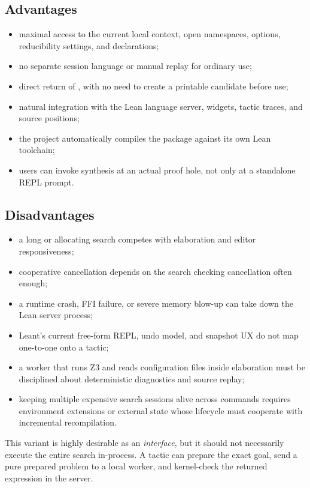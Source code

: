 \documentclass[10pt,letterpaper,oneside]{report}
\newcommand{\code}[1]{\texttt{\detokenize{#1}}}
\begin{document}
\subsection{Advantages}

\begin{itemize}
  \item maximal access to the current local context, open namespaces, options, reducibility settings, and declarations;
  \item no separate session language or manual replay for ordinary use;
  \item direct return of \code{Expr}, with no need to create a printable candidate before use;
  \item natural integration with the Lean language server, widgets, tactic traces, and source positions;
  \item the project automatically compiles the package against its own Lean toolchain;
  \item users can invoke synthesis at an actual proof hole, not only at a standalone REPL prompt.
\end{itemize}

\subsection{Disadvantages}

\begin{itemize}
  \item a long or allocating search competes with elaboration and editor responsiveness;
  \item cooperative cancellation depends on the search checking cancellation often enough;
  \item a runtime crash, FFI failure, or severe memory blow-up can take down the Lean server process;
  \item Leant's current free-form REPL, undo model, and snapshot UX do not map one-to-one onto a tactic;
  \item a worker that runs Z3 and reads configuration files inside elaboration must be disciplined about deterministic diagnostics and source replay;
  \item keeping multiple expensive search sessions alive across commands requires environment extensions or external state whose lifecycle must cooperate with incremental recompilation.
\end{itemize}

This variant is highly desirable as an \emph{interface}, but it should not necessarily execute the entire search in-process. A tactic can prepare the exact goal, send a pure prepared problem to a local worker, and kernel-check the returned expression in the server.
\end{document}
